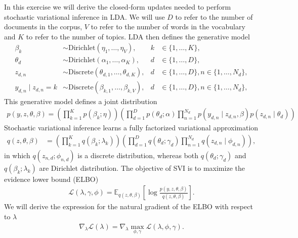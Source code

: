 \documentclass [12pt]{article}
\newcommand{\E}{\ensuremath{\mathbb{E}}}
\begin{document}
In this exercise we will derive the closed-form updates needed to perform stochastic variational inference in LDA. We will use $D$ to refer to the number of documents in the corpus, $V$ to refer to the number of words in the vocabulary and $K$ to refer to the number of topics. LDA then defines the generative model
\begin{align*}
	\beta_k 
    &\sim 
    \text{Dirichlet}(\eta_1, \ldots, \eta_V),
    &
    k &\in \{1, \ldots, K\},
    \\
    \theta_{d} 
    &\sim 
    \text{Dirichlet}(\alpha_1, \ldots, \alpha_K),
    &
    d &\in \{1, \ldots, D\},
    \\
    z_{d,n} 
    &\sim 
    \text{Discrete}(\theta_{d,1}, \ldots, \theta_{d,K}),
    &
    d &\in \{1, \ldots, D\}, n \in \{1, \ldots, N_d\},
    \\
    y_{d,n} \mid z_{d,n}\!=\!k
    &\sim 
    \text{Discrete}(\beta_{k,1}, \ldots, \beta_{k,V}),
    &
    d &\in \{1, \ldots, D\}, n \in \{1, \ldots, N_d\},
\end{align*}
This generative model defines a joint distribution
\begin{align*}
	p(y, z, \theta, \beta) 
    = 
	\left(
    	\prod_{k=1}^K p(\beta_k ; \eta)
    \right)
	\left(
    \prod_{d=1}^D
    	p(\theta_d ; \alpha)
    	\prod_{n=1}^{N_d}
    	p(y_{d,n} \mid z_{d,n},\beta)
        p(z_{d,n} \mid \theta_d)
    \right)
\end{align*}
Stochastic variational inference learns a fully factorized variational approximation 
\begin{align*}
	q(z, \theta, \beta) &= 
	\left(
    	\prod_{k=1}^K q(\beta_k ; \lambda_k)
    \right)
	\left(
    \prod_{d=1}^D
    	q(\theta_d ; \gamma_d)
    	\prod_{n=1}^{N_d}
        q(z_{d,n} \mid \phi_{d,n})
    \right),
\end{align*}
in which $q(z_{n,d} ; \phi_{n,d})$ is a discrete distribution, whereas both $q(\theta_d ; \gamma_d)$ and $q(\beta_k ; \lambda_k)$ are Dirichlet distribution. The objective of SVI is to maximize the evidence lower bound (ELBO)
\begin{align*}
	\mathcal{L}(\lambda,\gamma, \phi)
    =
    \E_{q(z,\theta,\beta)}
    \left[
    	\log 
        \frac{p(y,z,\theta,\beta)}
             {q(z, \theta, \beta)}
    \right].
\end{align*}
We will derive the expression for the natural gradient of the ELBO with respect to $\lambda$
\begin{align*}
	\nabla_\lambda \mathcal{L}(\lambda)
    =
	\nabla_\lambda \max_{\phi, \gamma} \mathcal{L}(\lambda, \phi, \gamma). 
\end{align*}
\end{document}
